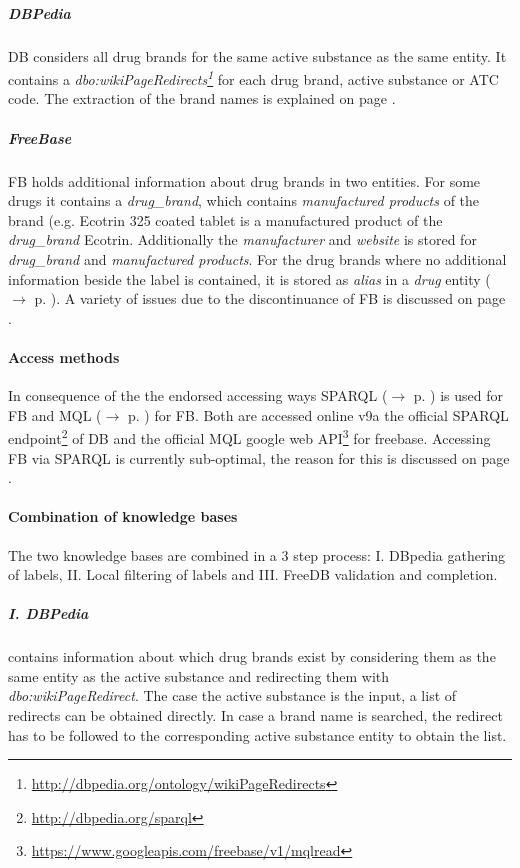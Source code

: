 \documentclass[11pt,titlepage,oneside,openany]{book}
\begin{document}
\subparagraph{DBPedia}
\label{dbpedia}

DB considers all drug brands for the same active substance as the same entity. It contains a \textit{dbo:wikiPageRedirects\footnote{\url{http://dbpedia.org/ontology/wikiPageRedirects}}} for each drug brand, active substance or ATC code. The extraction of the brand names is explained on page \pageref{limitations:filtering}.


\subparagraph{FreeBase}
\label{freebase}

FB holds additional information about drug brands in two entities. For some  drugs it contains a \textit{drug\_brand}, which contains \textit{manufactured products} of the brand (e.g. Ecotrin 325 coated tablet is a manufactured product of the \textit{drug\_brand} Ecotrin. Additionally the \textit{manufacturer} and \textit{website} is stored for \textit{drug\_brand} and \textit{manufactured products}.
For the drug brands where no additional information beside the label is contained, it is stored as \textit{alias} in a \textit{drug} entity ($\rightarrow$ p. \pageref{limitations:fb_drugs}).  A variety of issues due to the discontinuance of FB is discussed on page \pageref{prob:freebase}.



\paragraph{Access methods}
\label{access_methods}
In consequence of the the endorsed accessing ways SPARQL ($\rightarrow$ p. \pageref{sparql}) is used for FB and MQL ($\rightarrow$ p. \pageref{mql}) for FB. Both are accessed online v9a the official SPARQL endpoint\footnote{\url{http://dbpedia.org/sparql}} of DB and the official MQL google web API\footnote{\url{https://www.googleapis.com/freebase/v1/mqlread}} for freebase. Accessing FB via SPARQL is currently sub-optimal, the reason for this is discussed on page \pageref{challenges:fb}.



\paragraph{Combination of knowledge bases}
\label{dataset_combination}
The two knowledge bases are combined in a 3 step process: I. DBpedia gathering of labels, II. Local filtering of labels and III. FreeDB validation and completion.


\subparagraph{I. DBPedia} contains information about which drug brands exist by considering them as the same entity as the active substance and redirecting them with \textit{dbo:wikiPageRedirect}. The case the active substance is the input, a list of redirects can be obtained directly. In case a brand name is searched, the redirect has to be followed to the corresponding active substance entity to obtain the list.
\end{document}
